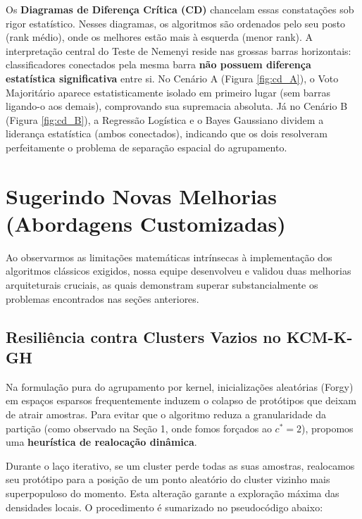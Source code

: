\documentclass[12pt,a4paper]{article}
\begin{document}
Os \textbf{Diagramas de Diferença Crítica (CD)} chancelam essas constatações sob rigor estatístico. Nesses diagramas, os algoritmos são ordenados pelo seu posto (rank médio), onde os melhores estão mais à esquerda (menor rank). A interpretação central do Teste de Nemenyi reside nas grossas barras horizontais: classificadores conectados pela mesma barra \textbf{não possuem diferença estatística significativa} entre si. No Cenário A (Figura \ref{fig:cd_A}), o Voto Majoritário aparece estatisticamente isolado em primeiro lugar (sem barras ligando-o aos demais), comprovando sua supremacia absoluta. Já no Cenário B (Figura \ref{fig:cd_B}), a Regressão Logística e o Bayes Gaussiano dividem a liderança estatística (ambos conectados), indicando que os dois resolveram perfeitamente o problema de separação espacial do agrupamento.


\newpage
\section{Sugerindo Novas Melhorias (Abordagens Customizadas)}

Ao observarmos as limitações matemáticas intrínsecas à implementação dos algoritmos clássicos exigidos, nossa equipe desenvolveu e validou duas melhorias arquiteturais cruciais, as quais demonstram superar substancialmente os problemas encontrados nas seções anteriores.

\subsection{Resiliência contra Clusters Vazios no KCM-K-GH}
Na formulação pura do agrupamento por kernel, inicializações aleatórias (Forgy) em espaços esparsos frequentemente induzem o colapso de protótipos que deixam de atrair amostras. Para evitar que o algoritmo reduza a granularidade da partição (como observado na Seção 1, onde fomos forçados ao $c^*=2$), propomos uma \textbf{heurística de realocação dinâmica}.

Durante o laço iterativo, se um cluster perde todas as suas amostras, realocamos seu protótipo para a posição de um ponto aleatório do cluster vizinho mais superpopuloso do momento. Esta alteração garante a exploração máxima das densidades locais. O procedimento é sumarizado no pseudocódigo abaixo:
\end{document}
